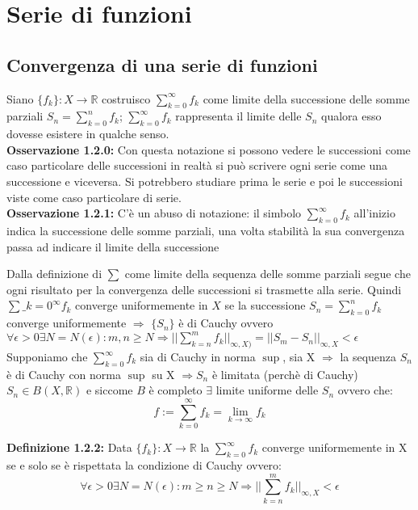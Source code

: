 \documentclass[a4paper,11pt,titlepage]{book}
\begin{document}
\section{Serie di funzioni}

\subsection{Convergenza di una serie di funzioni}

Siano $\{f_{k}\}:X\rightarrow\mathbb{R}$ costruisco $\sum_{k=0}^\infty f_{k}$ come limite della successione delle somme parziali  $S_n=\sum_{k=0}^{n}f_k$; $\sum_{k=0}^\infty f_{k}$ rappresenta il limite delle $S_n$ qualora esso dovesse esistere in qualche senso.\\

\textbf{Osservazione 1.2.0:} Con questa notazione si possono vedere le successioni come caso particolare delle successioni in realtà si può scrivere ogni serie come una successione e viceversa. Si potrebbero studiare prima le serie e poi le successioni viste come caso particolare di serie.\\

\textbf{Osservazione 1.2.1:} C'è un abuso di notazione: il simbolo $\sum_{k=0}^\infty f_{k}$ all'inizio indica la successione delle somme parziali, una volta stabilità la sua convergenza passa ad indicare il limite della successione


Dalla definizione di $\sum$ come limite della sequenza delle somme parziali segue che ogni risultato per la convergenza delle successioni si trasmette alla serie.
Quindi $\sum\_{k=0}^\infty f_{k}$ converge uniformemente in $X$ se  la successione $S_n=\sum_{k=0}^{n}f_k$ converge uniformemente $\Rightarrow$ $\{S_n\}$ è di Cauchy ovvero $\forall{\epsilon}>0 \exists N=N(\epsilon): m,n\geq N \Rightarrow ||\sum_{k=n}^{m} f_{k}||_{\infty,X)}=||S_m-S_n||_{\infty,X}<\epsilon$\\

Supponiamo che $\sum_{k=0}^{\infty} f_{k}$ sia di Cauchy in norma $\sup$, sia X $\Rightarrow$ la sequenza $S_n$ è di Cauchy con norma $\sup$ su X $\Rightarrow S_n$ è limitata (perchè di Cauchy) $S_n\in B(X,\mathbb{R})$ e siccome $B$ è completo $\exists$ limite uniforme delle $S_n$ ovvero che: $$f:=\sum\limits_{k=0}^{\infty}f_k=\lim\limits_{k\to\infty}f_k$$

\textbf{Definizione 1.2.2:} Data $\{f_{k}\}:X\rightarrow\mathbb{R}$ la $\sum_{k=0}^\infty f_{k}$ converge uniformemente in X se e solo se è rispettata la condizione di Cauchy ovvero: $$\forall\epsilon >0 \exists N=N(\epsilon): m\geq n\geq N \Rightarrow ||\sum\limits_{k=n}^{m} f_{k}||_{\infty,X}<\epsilon$$
\end{document}
